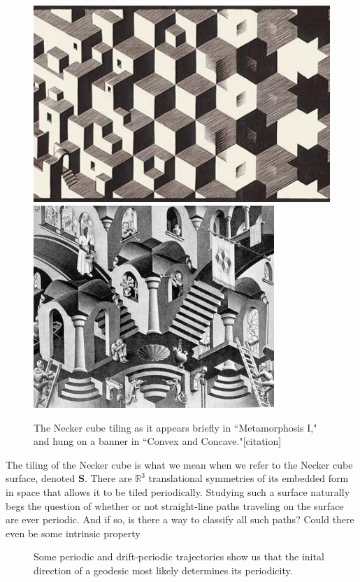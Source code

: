 \documentclass[]{article}
\begin{document}
\begin{figure}[H]
\begin{center}
\includegraphics[scale=0.4]{escher.jpg}
\includegraphics[scale=0.55]{escher2.jpg}
\caption{The Necker cube tiling as it appears briefly in ``Metamorphosis I," and hung on a banner in ``Convex and Concave."[citation]}
\label{fig:Escher}
\end{center}
\end{figure}

The tiling of the Necker cube is what we mean when we refer to the Necker cube surface, denoted $\mathbf S$. There are $\mathbb R^3$ translational symmetries of its embedded form in space that allows it to be tiled periodically. Studying such a surface naturally begs the question of whether or not straight-line paths traveling on the surface are ever periodic. And if so, is there a way to classify all such paths? Could there even be some intrinsic property 
\begin{figure}[H]
\centering

\caption{Some periodic and drift-periodic trajectories show us that the inital direction of a geodesic most likely determines its periodicity.}
\end{figure}
\end{document}
